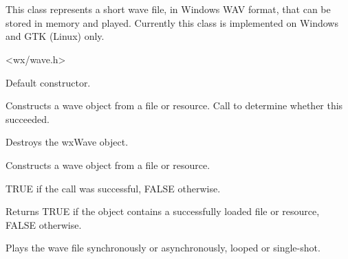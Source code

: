 \section{}\label{wxwave}

This class represents a short wave file, in Windows WAV format, that
can be stored in memory and played. Currently this class is implemented
on Windows and GTK (Linux) only.




<wx/wave.h>


\label{wxwaveconstr}


Default constructor.


Constructs a wave object from a file or resource. Call  to
determine whether this succeeded.






Destroys the wxWave object.

\label{wxwavecreate}


Constructs a wave object from a file or resource.





TRUE if the call was successful, FALSE otherwise.

\label{wxwaveisok}


Returns TRUE if the object contains a successfully loaded file or resource, FALSE otherwise.

\label{wxwaveplay}


Plays the wave file synchronously or asynchronously, looped or single-shot.


